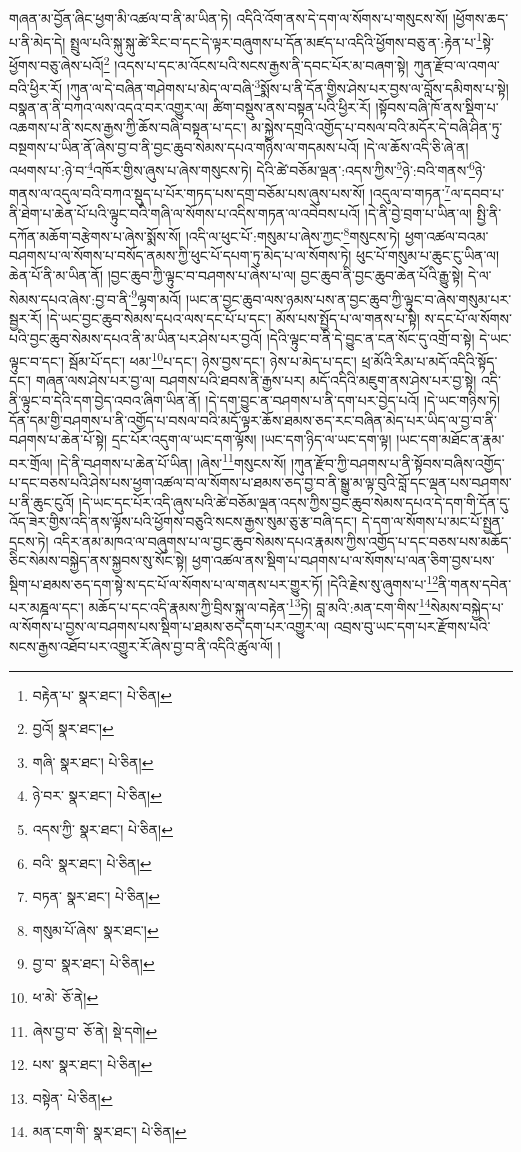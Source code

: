 གཞན་མ་བྱོན་ཞིང་ཕྱག་མི་འཚལ་བ་ནི་མ་ཡིན་ཏེ། འདིའི་འོག་ནས་དེ་དག་ལ་སོགས་པ་གསུངས་སོ། །ཕྱོགས་ཆད་པ་ནི་མེད་དེ། སྤྲུལ་པའི་སྐུ་སྐུ་ཚེ་རིང་བ་དང་དེ་ལྟར་བཞུགས་པ་དོན་མཛད་པ་འདིའི་ཕྱོགས་བཅུ་ན་:རྟེན་པ་\footnote{བརྟེན་པ་  སྣར་ཐང་།  པེ་ཅིན། }སྟེ་ཕྱོགས་བཅུ་ཞེས་པའོ།\footnote{བྱའོ།  སྣར་ཐང་། } །འདས་པ་དང་མ་འོངས་པའི་སངས་རྒྱས་ནི་དབང་པོར་མ་བཞག་སྟེ། ཀུན་རྫོབ་ལ་འགལ་བའི་ཕྱིར་རོ། །ཀུན་ལ་དེ་བཞིན་གཤེགས་པ་མེད་ལ་བཞི་\footnote{གཞི་  སྣར་ཐང་།  པེ་ཅིན། }སྨོས་པ་ནི་དོན་གྱིས་ཤེས་པར་བྱས་ལ་བློས་དམིགས་པ་སྟེ། བསྣན་ན་ནི་བཀའ་ལས་འདའ་བར་འགྱུར་ལ། ཚིག་བསྡུས་ནས་བསྟན་པའི་ཕྱིར་རོ། །སྟོབས་བཞི་ཁོ་ནས་སྡིག་པ་འཆགས་པ་ནི་སངས་རྒྱས་ཀྱི་ཆོས་བཞི་བསྟན་པ་དང་། མ་སྐྱེས་དགྲའི་འགྱོད་པ་བསལ་བའི་མདོར་དེ་བཞི་ཤིན་ཏུ་བསྔགས་པ་ཡིན་ནོ་ཞེས་བྱ་བ་ནི་བྱང་ཆུབ་སེམས་དཔའ་གཉིས་ལ་གདམས་པའོ། །དེ་ལ་ཆོས་འདི་ཅི་ཞེ་ན། འཕགས་པ་:ཉེ་བ་\footnote{ཉེ་བར་  སྣར་ཐང་།  པེ་ཅིན། }འཁོར་གྱིས་ཞུས་པ་ཞེས་གསུངས་ཏེ། དེའི་ཚེ་བཅོམ་ལྡན་:འདས་ཀྱིས་\footnote{འདས་ཀྱི་  སྣར་ཐང་།  པེ་ཅིན། }ཉེ་:བའི་གནས་\footnote{བའི་  སྣར་ཐང་།  པེ་ཅིན། }ཉེ་གནས་ལ་འདུལ་བའི་བཀའ་སྡུད་པ་པོར་གཏད་པས་དགྲ་བཅོམ་པས་ཞུས་པས་སོ། །འདུལ་བ་གཏན་\footnote{བཏན་  སྣར་ཐང་།  པེ་ཅིན། }ལ་དབབ་པ་ནི་ཐེག་པ་ཆེན་པོ་པའི་ལྟུང་བའི་གཞི་ལ་སོགས་པ་འདིས་གཏན་ལ་འབེབས་པའོ། །དེ་ནི་བྱེ་བྲག་པ་ཡིན་ལ། སྤྱི་ནི་དཀོན་མཆོག་བརྩེགས་པ་ཞེས་སྨོས་སོ། །འདི་ལ་ཕུང་པོ་:གསུམ་པ་ཞེས་ཀྱང་\footnote{གསུམ་པོ་ཞེས་  སྣར་ཐང་། }གསུངས་ཏེ། ཕྱག་འཚལ་བའམ་བཤགས་པ་ལ་སོགས་པ་བསོད་ནམས་ཀྱི་ཕུང་པོ་དཔག་ཏུ་མེད་པ་ལ་སོགས་ཏེ། ཕུང་པོ་གསུམ་པ་ཆུང་ངུ་ཡིན་ལ། ཆེན་པོ་ནི་མ་ཡིན་ནོ། །བྱང་ཆུབ་ཀྱི་ལྟུང་བ་བཤགས་པ་ཞེས་པ་ལ། བྱང་ཆུབ་ནི་བྱང་ཆུབ་ཆེན་པོའི་རྒྱུ་སྟེ། དེ་ལ་སེམས་དཔའ་ཞེས་:བྱ་བ་ནི་\footnote{བྱ་བ་  སྣར་ཐང་།  པེ་ཅིན། }ལྷག་མའོ། །ཡང་ན་བྱང་ཆུབ་ལས་ཉམས་པས་ན་བྱང་ཆུབ་ཀྱི་ལྟུང་བ་ཞེས་གསུམ་པར་སྦྱར་རོ། །དེ་ཡང་བྱང་ཆུབ་སེམས་དཔའ་ལས་དང་པོ་པ་དང་། མོས་པས་སྤྱོད་པ་ལ་གནས་པ་སྟེ། ས་དང་པོ་ལ་སོགས་པའི་བྱང་ཆུབ་སེམས་དཔའ་ནི་མ་ཡིན་པར་ཤེས་པར་བྱའོ། །དེའི་ལྟུང་བ་ནི་དེ་བྱུང་ན་ངན་སོང་དུ་འགྲོ་བ་སྟེ། དེ་ཡང་ལྟུང་བ་དང་། སྦོམ་པོ་དང་། ཕམ་\footnote{ཕ་མེ་  ཅོ་ནེ། }པ་དང་། ཉེས་བྱས་དང་། ཉེས་པ་མེད་པ་དང་། ཕྲ་མོའི་རིམ་པ་མདོ་འདིའི་སྟོད་དང་། གཞན་ལས་ཤེས་པར་བྱ་ལ། བཤགས་པའི་ཐབས་ནི་རྒྱས་པར། མདོ་འདིའི་མཇུག་ནས་ཤེས་པར་བྱ་སྟེ། འདི་ནི་ལྟུང་བ་དེའི་དག་བྱེད་འབའ་ཞིག་ཡིན་ནོ། །དེ་དག་བྱུང་ན་བཤགས་པ་ནི་དག་པར་བྱེད་པའོ། །དེ་ཡང་གཉིས་ཏེ། དོན་དམ་གྱི་བཤགས་པ་ནི་འགྱོད་པ་བསལ་བའི་མདོ་ལྟར་ཆོས་ཐམས་ཅད་རང་བཞིན་མེད་པར་ཡིད་ལ་བྱ་བ་ནི་བཤགས་པ་ཆེན་པོ་སྟེ། དྲང་པོར་འདུག་ལ་ཡང་དག་ལྟོས། །ཡང་དག་ཉིད་ལ་ཡང་དག་ལྟ། །ཡང་དག་མཐོང་ན་རྣམ་བར་གྲོལ། །དེ་ནི་བཤགས་པ་ཆེན་པོ་ཡིན། །ཞེས་\footnote{ཞེས་བྱ་བ་  ཅོ་ནེ།  སྡེ་དགེ། }གསུངས་སོ། །ཀུན་རྫོབ་ཀྱི་བཤགས་པ་ནི་སྟོབས་བཞིས་འགྱོད་པ་དང་བཅས་པའི་ཤེས་པས་ཕྱག་འཚལ་བ་ལ་སོགས་པ་ཐམས་ཅད་བྱ་བ་ནི་སྒྱུ་མ་ལྟ་བུའི་བློ་དང་ལྡན་པས་བཤགས་པ་ནི་ཆུང་ངུའོ། །དེ་ཡང་དང་པོར་འདི་ཞུས་པའི་ཚེ་བཅོམ་ལྡན་འདས་ཀྱིས་བྱང་ཆུབ་སེམས་དཔའ་དེ་དག་གི་དོན་དུ་འོད་ཟེར་གྱིས་འདི་ནས་ལྟོས་པའི་ཕྱོགས་བཅུའི་སངས་རྒྱས་སུམ་ཅུ་རྩ་བཞི་དང་། དེ་དག་ལ་སོགས་པ་མང་པོ་སྤྱན་དྲངས་ཏེ། འདིར་ནམ་མཁའ་ལ་བཞུགས་པ་ལ་བྱང་ཆུབ་སེམས་དཔའ་རྣམས་ཀྱིས་འགྱོད་པ་དང་བཅས་པས་མཆོད་ཅིང་སེམས་བསྐྱེད་ནས་སྐྱབས་སུ་སོང་སྟེ། ཕྱག་འཚལ་ནས་སྡིག་པ་བཤགས་པ་ལ་སོགས་པ་ལན་ཅིག་བྱས་པས་སྡིག་པ་ཐམས་ཅད་དག་སྟེ་ས་དང་པོ་ལ་སོགས་པ་ལ་གནས་པར་གྱུར་ཏོ། །དེའི་རྗེས་སུ་ཞུགས་པ་\footnote{པས་  སྣར་ཐང་།  པེ་ཅིན། }ནི་གནས་དབེན་པར་མཎྜལ་དང་། མཆོད་པ་དང་འདི་རྣམས་ཀྱི་བྲིས་སྐུ་ལ་བརྟེན་\footnote{བསྟེན་  པེ་ཅིན། }ཏེ། བླ་མའི་:མན་ངག་གིས་\footnote{མན་ངག་གི་  སྣར་ཐང་།  པེ་ཅིན། }སེམས་བསྐྱེད་པ་ལ་སོགས་པ་བྱས་ལ་བཤགས་པས་སྡིག་པ་ཐམས་ཅད་དག་པར་འགྱུར་ལ། འབྲས་བུ་ཡང་དག་པར་རྫོགས་པའི་སངས་རྒྱས་འཐོབ་པར་འགྱུར་རོ་ཞེས་བྱ་བ་ནི་འདིའི་ཚུལ་ལོ། །
